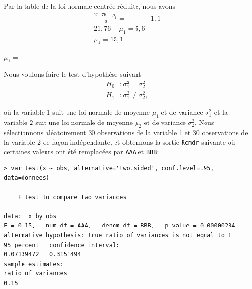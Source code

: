 \begin{questions}
\begin{solution}
Par la table de la loi normale centrée réduite, nous avons
\begin{align*}
    \frac{21,76-\mu_1}{6}=&1,1\\
    21,76-\mu_1=6,6\\
    \mu_1 =15,1
\end{align*}
\end{solution}
\vfill
$\mu_1=$
\newpage 

\question\label{test2variances}

Nous voulons faire le test d'hypothèse suivant 
\begin{align*}
H_0 &:\sigma_1^2 = \sigma_2^2\\
H_1 &:\sigma_1^2 \neq \sigma_2^2,
\end{align*}

où la variable 1 suit une loi normale de moyenne $\mu_1$ et de variance $\sigma_1^2$ et la variable 2 suit une loi normale de moyenne $\mu_2$ et de variance $\sigma_2^2$. Nous sélectionnons aléatoirement 30 observations de la variable 1 et 30 observations de la variable 2 de façon indépendante, et obtennons la sortie \texttt{Rcmdr} suivante où certaines valeurs ont été remplacées par \texttt{AAA} et \texttt{BBB}:

\begin{verbatim}
> var.test(x ~ obs, alternative='two.sided', conf.level=.95, data=donnees)

	F test to compare two variances

data:  x by obs
F = 0.15,   num df = AAA,   denom df = BBB,   p-value = 0.00000204
alternative hypothesis: true ratio of variances is not equal to 1
95 percent   confidence interval:
0.07139472   0.3151494
sample estimates:
ratio of variances 
0.15
\end{verbatim}

\end{questions}
